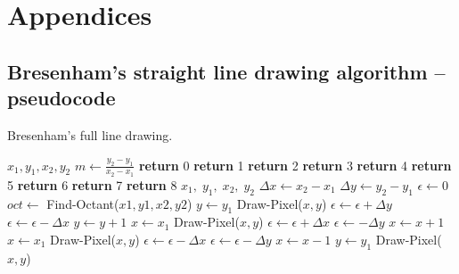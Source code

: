 \documentclass[a4paper]{article}
\begin{document}
\newpage
\appendix

\section{Appendices}


\subsection{Bresenham's straight line drawing algorithm -- pseudocode}
\label{app:bresenham_full_pseudo}

\begin{algorithm}[H]
\caption{Bresenham's full line drawing.}
\label{alg:bres_pt2}
\begin{algorithmic}[1]
	 {$x_1,y_1,x_2,y_2$} 
	\State $m \leftarrow \frac{y_2-y_1}{x_2-x_1}$
		\State \textbf{return} 0 
		\State \textbf{return} 1 
		\State \textbf{return} 2
		\State \textbf{return} 3
		\State \textbf{return} 4
		\State \textbf{return} 5
		\State \textbf{return} 6
		\State \textbf{return} 7
	\Else {}
		\State \textbf{return} 8
	\EndIf
\EndProcedure
\State
{} {$x_1,\; y_1,\; x_2,\; y_2$} 
	\State $\Delta x \leftarrow x_2 - x_1$
	\State $\Delta y \leftarrow y_2 - y_1$
	\State $\epsilon \leftarrow 0$
	\State $oct \leftarrow$ Find-Octant($x1,y1,x2,y2$)
	 
		\State $y \leftarrow y_1$
			\State Draw-Pixel($x,y$)
			\State $\epsilon \leftarrow \epsilon + \Delta y$
				\State $\epsilon \leftarrow \epsilon - \Delta x$
				\State $y \leftarrow y + 1$
			\EndIf
		\EndFor
	 
		\State $x \leftarrow x_1$
			\State Draw-Pixel($x,y$)
			\State $\epsilon \leftarrow \epsilon + \Delta x$
				\State $\epsilon \leftarrow - \Delta y$
				\State $x \leftarrow x + 1$
			\EndIf
		\EndFor
	 
		\State $x \leftarrow x_1$
			\State Draw-Pixel($x,y$)
			\State $\epsilon \leftarrow \epsilon - \Delta x$
			\If { $2\epsilon \geq \Delta$}
				\State $\epsilon \leftarrow \epsilon - \Delta y$
				\State $x \leftarrow x - 1$
			\EndIf
		\EndFor
	  
		\State $y \leftarrow y_1$
			\State Draw-Pixel($x,y$)

		\EndFor
	\EndIf
\EndProcedure
\end{algorithmic}
\end{algorithm}
\end{document}

